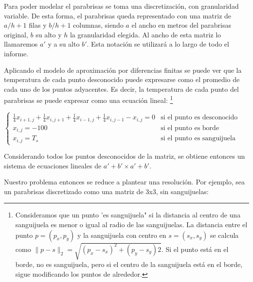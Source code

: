\documentclass[a4paper]{article}
\begin{document}
Para poder modelar el parabrisas se toma una discretización, con granularidad variable. De esta forma, el parabrisas queda representado con una matriz de $a/h+1$ filas y $b/h+1$ columnas, siendo $a$ el ancho en metros del parabrisas original, $b$ su alto y $h$ la granularidad elegida. Al ancho de esta matriz lo llamaremos $a'$ y a su alto $b'$. Esta notación se utilizará a lo largo de todo el informe.

Aplicando el modelo de aproximación por diferencias finitas se puede ver que la temperatura de cada punto desconocido puede expresarse como el promedio de cada uno de los puntos adyacentes. Es decir, la temperatura de cada punto del parabrisas se puede expresar como una ecuación lineal: \footnote{Consideramos que un punto 'es sanguijuela" si la distancia al centro de una sanguijuela es menor o igual al radio de las sanguijuelas. La distancia entre el punto $p=(p_x, p_y)$ y la sanguijuela con centro en $s=(s_x, s_y)$ se calcula como $\| p-s  \|_{2}= \sqrt{(p_x-s_x)^2+(p_y-s_y)2}$. Si el punto está en el borde, no es sanguijuela, pero si el centro de la sanguijuela está en el borde, sigue modificando los puntos de alrededor.} \newline 

$\left \{\begin{array}{ll}
\frac{1}{4}x_{i+1,j}+\frac{1}{4}x_{i,j+1}+\frac{1}{4}x_{i-1,j}+\frac{1}{4}x_{i,j-1}-x_{i,j}=0 & \text{si el punto es desconocido} \\  x_{i,j}=-100 & \text{si el punto es borde} \\ x_{i,j}=T_s & \text{si el punto es sanguijuela} \end{array}$ \newline

Considerando todos los puntos desconocidos de la matriz, se obtiene entonces un sistema de ecuaciones lineales de $a'+b' \times a'+b'$.

Nuestro problema entonces se reduce a plantear una resolución.
Por ejemplo, sea un parabrisas discretizado como una matriz de 3x3, sin sanguijuelas: \newline \newline
\end{document}
